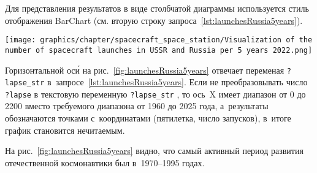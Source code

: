 Для представления результатов в виде столбчатой диаграммы используется стиль отображения BarChart 
(см. вторую строку запроса~\ref{lst:launchesRussia5years}).




\begin{figure*}[h!]
    \texttt{[image: graphics/chapter/spacecraft\_space\_station/Visualization of the number of spacecraft launches in USSR and Russia per 5 years 2022.png]}
    \caption[График запусков космических кораблей в СССР и России, 2022 год.]{Диаграмма количества запусков космических кораблей в СССР и России по пятилеткам}%
    \label{fig:launchesRussia5years}%
\end{figure*}



\newpage\phantom{blabla}

Горизонтальной ос\'{и} на рис.~\ref{fig:launchesRussia5years} 
отвечает переменая \mbox{\lstinline|?lapse_str|} в~запросе~\ref{lst:launchesRussia5years}. 
Если не преобразовывать число \lstinline|?lapse| 
в текстовую переменную \mbox{\lstinline|?lapse_str|}%
, то ось~X имеет диапазон от 0 до 2200 
вместо требуемого диапазона от 1960 до 2025 года, 
а~результаты обозначаются точками с~координатами (пятилетка, число запусков), 
в~итоге график становится нечитаемым. 

На рис.~\ref{fig:launchesRussia5years} видно, 
что самый активный период развития отечественной космонавтики был в~1970--1995 годах.



\newpage


